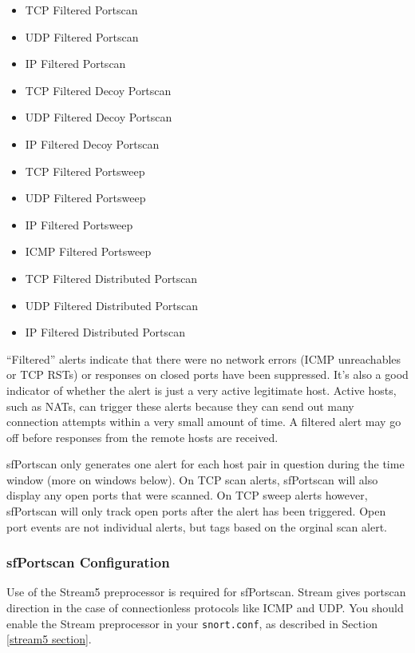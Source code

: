 \documentclass[english]{report}
\begin{document}
\begin{itemize}
\item TCP Filtered Portscan
\item UDP Filtered Portscan
\item IP Filtered Portscan

\item TCP Filtered Decoy Portscan
\item UDP Filtered Decoy Portscan
\item IP Filtered Decoy Portscan

\item TCP Filtered Portsweep
\item UDP Filtered Portsweep
\item IP Filtered Portsweep
\item ICMP Filtered Portsweep

\item TCP Filtered Distributed Portscan
\item UDP Filtered Distributed Portscan
\item IP Filtered Distributed Portscan
\end{itemize}

``Filtered'' alerts indicate that there were no network errors (ICMP
unreachables or TCP RSTs) or responses on closed ports have been suppressed.
It's also a good indicator of whether the alert is just a very active
legitimate host. Active hosts, such as NATs, can trigger these alerts because
they can send out many connection attempts within a very small amount of time.
A filtered alert may go off before responses from the remote hosts are
received.

sfPortscan only generates one alert for each host pair in question during the
time window (more on windows below). On TCP scan alerts, sfPortscan will also
display any open ports that were scanned. On TCP sweep alerts however,
sfPortscan will only track open ports after the alert has been triggered. Open
port events are not individual alerts, but tags based on the orginal scan
alert.

\subsubsection{sfPortscan Configuration}

Use of the Stream5 preprocessor is required for sfPortscan. Stream gives
portscan direction in the case of connectionless protocols like ICMP and UDP.
You should enable the Stream preprocessor in your \texttt{snort.conf}, as
described in Section \ref{stream5 section}.
\end{document}
